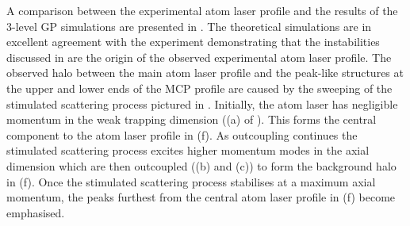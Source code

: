 A comparison between the experimental atom laser profile and the results of the 3-level GP simulations are presented in .  The theoretical simulations are in excellent agreement with the experiment demonstrating that the instabilities discussed in  are the origin of the observed experimental atom laser profile.  The observed halo between the main atom laser profile and the peak-like structures at the upper and lower ends of the MCP profile are caused by the sweeping of the stimulated scattering process pictured in .  Initially, the atom laser has negligible momentum in the weak trapping dimension ((a) of ).  This forms the central component to the atom laser profile in (f).  As outcoupling continues the stimulated scattering process excites higher momentum modes in the axial dimension which are then outcoupled ((b) and (c)) to form the background halo in (f).  Once the stimulated scattering process stabilises at a maximum axial momentum, the peaks furthest from the central atom laser profile in (f) become emphasised.

